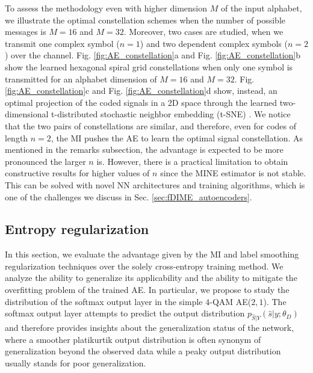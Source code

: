 To assess the methodology even with higher dimension $M$ of the input alphabet, we illustrate the optimal constellation schemes when the number of possible messages is $M=16$ and $M=32$. Moreover, two cases are studied, when we transmit one complex symbol ($n=1$) and two dependent complex symbols ($n=2$) over the channel. Fig. \ref{fig:AE_constellation}a and Fig. \ref{fig:AE_constellation}b show the learned hexagonal spiral grid constellations when only one symbol is transmitted for an alphabet dimension of $M=16$ and $M=32$. Fig. \ref{fig:AE_constellation}c and Fig. \ref{fig:AE_constellation}d show, instead, an optimal projection of the coded signals in a 2D space through the learned two-dimensional t-distributed stochastic neighbor embedding
(t-SNE) \cite{vandermaaten2008visualizing}. We notice that the two pairs of constellations are similar, and therefore, even for codes of length $n=2$, the MI pushes the AE to learn the optimal signal constellation. 
As mentioned in the remarks subsection, the advantage is expected to be more pronounced the larger $n$ is. However, there is a practical limitation to obtain constructive results for higher values of $n$ since the MINE estimator is not stable. This can be solved with novel NN architectures and training algorithms, which is one of the challenges we discuss in Sec. \ref{sec:fDIME_autoencoders}.

\subsection{Entropy regularization}
\label{subsec:autoencoders_results_overfitting}
In this section, we evaluate the advantage given by the MI and label smoothing regularization techniques over the solely cross-entropy training method. We analyze the ability to generalize its applicability and the ability to mitigate the overfitting problem of the trained AE. In particular, we propose to study the distribution of the softmax output layer in the simple $4$-QAM AE($2,1$). The softmax output layer attempts to predict the output distribution $p_{\hat{S}|Y}(\hat{s}|y;\theta_D)$ and therefore provides insights about the generalization status of the network, where a smoother platikurtik output distribution is often synonym of generalization beyond the observed data \cite{Pereyra2017} while a peaky output distribution usually stands for poor generalization.

